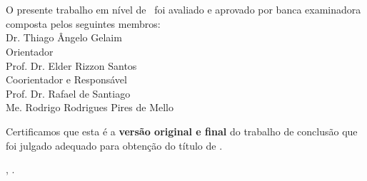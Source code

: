\imprimircapa

\imprimirfolhaderosto*

\begin{fichacatalografica}
	
\end{fichacatalografica}

\begin{folhadeaprovacao}
	\OnehalfSpacing
	\centering
	\imprimirautor\\%
	\vspace*{10pt}		
	\textbf{\imprimirtitulo}%
	\ifnotempty{\imprimirsubtitulo}{:~\imprimirsubtitulo}\\%
	\vspace*{\baselineskip}
	O presente trabalho em nível de \imprimirnivel~foi avaliado e aprovado por banca examinadora composta pelos seguintes membros:\\
	\vspace*{\baselineskip}
	Dr. Thiago Ângelo Gelaim\\
	Orientador\\
	\vspace*{\baselineskip}
	Prof. Dr. Elder Rizzon Santos \\
	Coorientador e Responsável\\
	\vspace*{\baselineskip}
	Prof. Dr. Rafael de Santiago\\
	\vspace*{\baselineskip}
	Me. Rodrigo Rodrigues Pires de Mello\\
	\vspace*{2\baselineskip}
	\begin{minipage}{\textwidth}
		Certificamos que esta é a \textbf{versão original e final} do trabalho de conclusão que foi julgado adequado para obtenção do título de \imprimirformacao.\\
	\end{minipage}
	\vspace*{\fill}
	\vspace*{\fill}
	\assinatura{\OnehalfSpacing\imprimirorientador \\ \imprimirorientadorRotulo}
	\vspace*{\fill}
	\imprimirlocal, \imprimirano.
\end{folhadeaprovacao}

